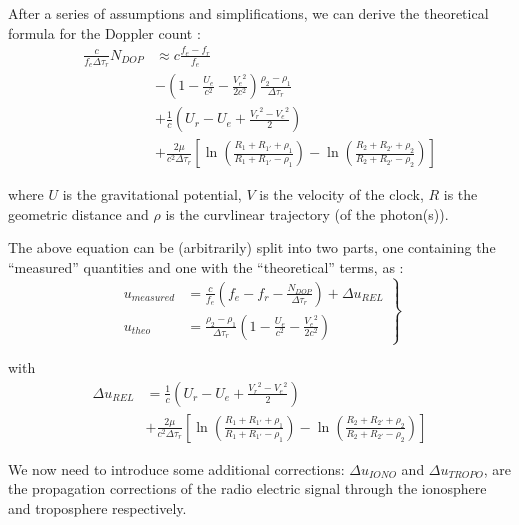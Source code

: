 After a series of assumptions and simplifications, we can derive the theoretical 
formula for the Doppler count \cite{lemoine-2016}:
\begin{equation}
    \begin{split}
        \frac{c}{f_e \Delta\tau_r} N_{DOP} & \approx c \frac{f_e - f_r}{f_e} \\
        & - (1 - \frac{U_e}{c^2} - \frac{{V_e}^2}{2 c^2}) \frac{\rho_2 - \rho_1}{\Delta\tau_r}\\
        & + \frac{1}{c} (U_r - U_e + \frac{{V_r}^2 - {V_e}^2}{2}) \\
        & + \frac{2 \mu}{c^2 \Delta\tau_r} [\ln{(\frac{R_1 + R_{1'} + \rho_1}{R_1 + R_{1'} - \rho_1})} - \ln{(\frac{R_2 + R_{2'} + \rho_2}{R_2 + R_{2'} - \rho_2})}]
    \end{split}
\end{equation}

where \(U\) is the gravitational potential, \(V\) is the velocity of the clock, \(R\) 
is the geometric distance and \(\rho\) is the curvlinear trajectory (of the photon(s)).

The above equation can be (arbitrarily) split into two parts, one containing the ``measured'' 
quantities and one with the ``theoretical'' terms, as \cite{lemoine-2016}:
\begin{equation}
    \label{eq:lem12}
    \left.\begin{aligned}
        u_{measured} & = \frac{c}{f_e} (f_e - f_r -
         \frac{N_{DOP}}{\Delta\tau_r}) + \Delta u_{REL} \\
        u_{theo} &= \frac{\rho_2 - \rho_1}{\Delta\tau_r} (1- \frac{U_e}{c^2} - \frac{{V_e}^2}{2 c^2})
    \end{aligned}
\right\}
\end{equation}

with
\begin{equation}
    \begin{split}
        \Delta u_{REL} &= \frac{1}{c} (U_r - U_e + \frac{{V_r}^2 - {V_e}^2}{2}) \\
        & + \frac{2 \mu}{c^2 \Delta\tau_r} [\ln{(\frac{R_1 + R_{1'} + \rho_1}{R_1 + R_{1'} - \rho_1})} - \ln{(\frac{R_2 + R_{2'} + \rho_2}{R_2 + R_{2'} - \rho_2})}]
    \end{split}
\end{equation}

We now need to introduce some additional corrections:
\(\Delta u_{IONO}\) and \(\Delta u_{TROPO}\), are the propagation corrections of 
the radio electric signal through the ionosphere and troposphere respectively. 

